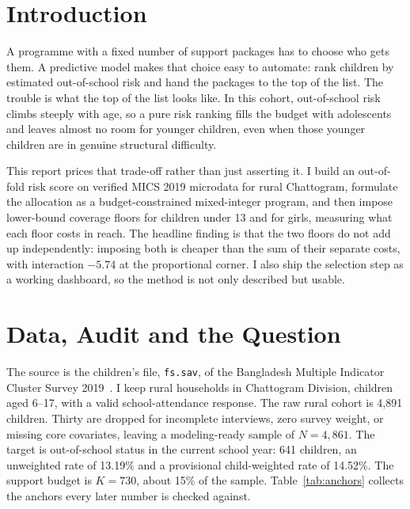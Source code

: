 \documentclass[12.1pt,a4paper]{article}
\begin{document}
\vspace{4pt}

\section{Introduction}

A programme with a fixed number of support packages has to choose who gets them. A predictive model makes that choice easy to automate: rank children by estimated out-of-school risk and hand the packages to the top of the list. The trouble is what the top of the list looks like. In this cohort, out-of-school risk climbs steeply with age, so a pure risk ranking fills the budget with adolescents and leaves almost no room for younger children, even when those younger children are in genuine structural difficulty.

This report prices that trade-off rather than just asserting it. I build an out-of-fold risk score on verified MICS 2019 microdata for rural Chattogram, formulate the allocation as a budget-constrained mixed-integer program, and then impose lower-bound coverage floors for children under 13 and for girls, measuring what each floor costs in reach. The headline finding is that the two floors do not add up independently: imposing both is cheaper than the sum of their separate costs, with interaction $-5.74$ at the proportional corner. I also ship the selection step as a working dashboard, so the method is not only described but usable.

\section{Data, Audit and the Question}

The source is the children's file, \texttt{fs.sav}, of the Bangladesh Multiple Indicator Cluster Survey 2019~\cite{mics2019}. I keep rural households in Chattogram Division, children aged 6--17, with a valid school-attendance response. The raw rural cohort is 4,891 children. Thirty are dropped for incomplete interviews, zero survey weight, or missing core covariates, leaving a modeling-ready sample of $N = 4{,}861$. The target is out-of-school status in the current school year: 641 children, an unweighted rate of 13.19\% and a provisional child-weighted rate of 14.52\%. The support budget is $K = 730$, about 15\% of the sample. Table~\ref{tab:anchors} collects the anchors every later number is checked against.
\end{document}
